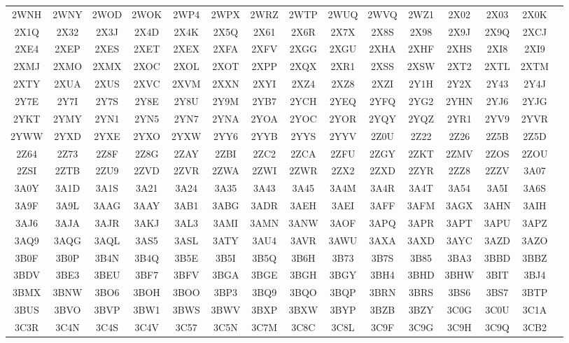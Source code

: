 \begin{longtable}{ c c c c c c c c c c c c c c c }
	2WNH & 2WNY & 2WOD & 2WOK & 2WP4 & 2WPX & 2WRZ & 2WTP & 2WUQ & 2WVQ & 2WZ1 & 2X02 & 2X03 & 2X0K  \\
	2X1Q & 2X32 & 2X3J & 2X4D & 2X4K & 2X5Q & 2X61 & 2X6R & 2X7X & 2X8S & 2X98 & 2X9J & 2X9Q & 2XCJ  \\
	2XE4 & 2XEP & 2XES & 2XET & 2XEX & 2XFA & 2XFV & 2XGG & 2XGU & 2XHA & 2XHF & 2XHS & 2XI8 & 2XI9  \\
	2XMJ & 2XMO & 2XMX & 2XOC & 2XOL & 2XOT & 2XPP & 2XQX & 2XR1 & 2XSS & 2XSW & 2XT2 & 2XTL & 2XTM  \\
	2XTY & 2XUA & 2XUS & 2XVC & 2XVM & 2XXN & 2XYI & 2XZ4 & 2XZ8 & 2XZI & 2Y1H & 2Y2X & 2Y43 & 2Y4J  \\
	2Y7E & 2Y7I & 2Y7S & 2Y8E & 2Y8U & 2Y9M & 2YB7 & 2YCH & 2YEQ & 2YFQ & 2YG2 & 2YHN & 2YJ6 & 2YJG  \\
	2YKT & 2YMY & 2YN1 & 2YN5 & 2YN7 & 2YNA & 2YOA & 2YOC & 2YOR & 2YQY & 2YQZ & 2YR1 & 2YV9 & 2YVR  \\
	2YWW & 2YXD & 2YXE & 2YXO & 2YXW & 2YY6 & 2YYB & 2YYS & 2YYV & 2Z0U & 2Z22 & 2Z26 & 2Z5B & 2Z5D  \\
	2Z64 & 2Z73 & 2Z8F & 2Z8G & 2ZAY & 2ZBI & 2ZC2 & 2ZCA & 2ZFU & 2ZGY & 2ZKT & 2ZMV & 2ZOS & 2ZOU  \\
	2ZSI & 2ZTB & 2ZU9 & 2ZVD & 2ZVR & 2ZWA & 2ZWI & 2ZWR & 2ZX2 & 2ZXD & 2ZYR & 2ZZ8 & 2ZZV & 3A07  \\
	3A0Y & 3A1D & 3A1S & 3A21 & 3A24 & 3A35 & 3A43 & 3A45 & 3A4M & 3A4R & 3A4T & 3A54 & 3A5I & 3A6S  \\
	3A9F & 3A9L & 3AAG & 3AAY & 3AB1 & 3ABG & 3ADR & 3AEH & 3AEI & 3AFF & 3AFM & 3AGX & 3AHN & 3AIH  \\
	3AJ6 & 3AJA & 3AJR & 3AKJ & 3AL3 & 3AMI & 3AMN & 3ANW & 3AOF & 3APQ & 3APR & 3APT & 3APU & 3APZ  \\
	3AQ9 & 3AQG & 3AQL & 3AS5 & 3ASL & 3ATY & 3AU4 & 3AVR & 3AWU & 3AXA & 3AXD & 3AYC & 3AZD & 3AZO  \\
	3B0F & 3B0P & 3B4N & 3B4Q & 3B5E & 3B5I & 3B5Q & 3B6H & 3B73 & 3B7S & 3B85 & 3BA3 & 3BBD & 3BBZ  \\
	3BDV & 3BE3 & 3BEU & 3BF7 & 3BFV & 3BGA & 3BGE & 3BGH & 3BGY & 3BH4 & 3BHD & 3BHW & 3BIT & 3BJ4  \\
	3BMX & 3BNW & 3BO6 & 3BOH & 3BOO & 3BP3 & 3BQ9 & 3BQO & 3BQP & 3BRN & 3BRS & 3BS6 & 3BS7 & 3BTP  \\
	3BUS & 3BVO & 3BVP & 3BW1 & 3BWS & 3BWV & 3BXP & 3BXW & 3BYP & 3BZB & 3BZY & 3C0G & 3C0U & 3C1A  \\
	3C3R & 3C4N & 3C4S & 3C4V & 3C57 & 3C5N & 3C7M & 3C8C & 3C8L & 3C9F & 3C9G & 3C9H & 3C9Q & 3CB2  \\

\end{longtable}
